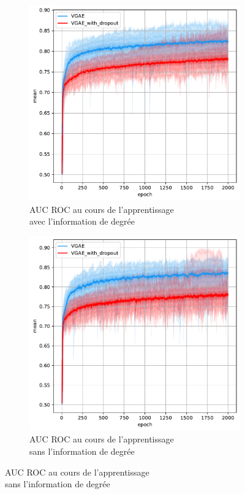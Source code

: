 \documentclass{article}
\begin{document}
\begin{figure}
    \begin{subfigure}{0.5\textwidth}
      \includegraphics[width=\textwidth]{graphics/AUCs_degree_dropout_cinf.svg.pdf}
      \centering
      \caption{AUC ROC au cours de l'apprentissage\\ avec l'information de degrée}
    \end{subfigure}
    \begin{subfigure}{0.5\textwidth}
      \includegraphics[width=\textwidth]{graphics/AUCs_no_degree_dropout_cinf.svg.pdf}
      \centering
      \caption{AUC ROC au cours de l'apprentissage\\ sans l'information de degrée}
    \end{subfigure}
  \end{figure}
\end{document}
